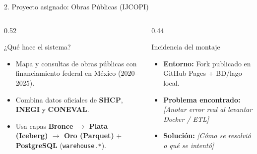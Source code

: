 \documentclass[aspectratio=169,11pt]{beamer}
\begin{document}
\begin{frame}{2. Proyecto asignado: Obras Públicas (IJCOPI)}
  \begin{columns}[T,totalwidth=\textwidth]
    \begin{column}{0.52\textwidth}
      \begin{block}{¿Qué hace el sistema?}
        \begin{itemize}
          \item Mapa y consultas de obras públicas con financiamiento federal en México (2020--2025).
          \item Combina datos oficiales de \textbf{SHCP}, \textbf{INEGI} y \textbf{CONEVAL}.
          \item Usa capas \textbf{Bronce $\to$ Plata (Iceberg) $\to$ Oro (Parquet)} + \textbf{PostgreSQL} (\texttt{warehouse.*}).
        \end{itemize}
      \end{block}
    \end{column}

    \begin{column}{0.44\textwidth}
      \begin{exampleblock}{Incidencia del montaje}
        \begin{itemize}
          \item \textbf{Entorno:} Fork publicado en GitHub Pages + BD/lago local.
          \item \textbf{Problema encontrado:} \textit{[Anotar error real al levantar Docker / ETL]}
          \item \textbf{Solución:} \textit{[Cómo se resolvió o qué se intentó]}
        \end{itemize}
      \end{exampleblock}
    \end{column}
  \end{columns}
\end{frame}
\end{document}

